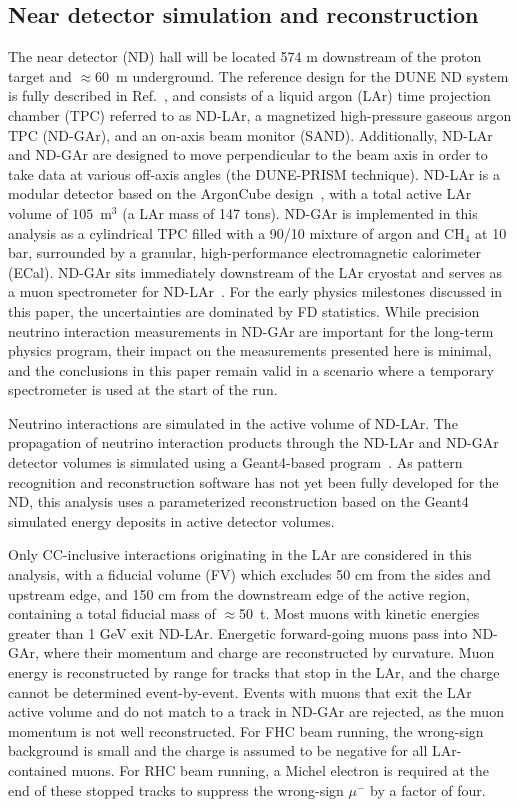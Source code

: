 \subsection{Near detector simulation and reconstruction}
The near detector (ND) hall will be located 574 m downstream of the proton target and $\approx$60~m underground. The reference design for the DUNE ND system is fully described in Ref.~\cite{AbedAbud:2021hpb}, and consists of a liquid argon (LAr) time projection chamber (TPC) referred to as ND-LAr, a magnetized high-pressure gaseous argon TPC (ND-GAr), and an on-axis beam monitor (SAND). Additionally, ND-LAr and ND-GAr are designed to move perpendicular to the beam axis in order to take data at various off-axis angles (the DUNE-PRISM technique). ND-LAr is a modular detector based on the ArgonCube design~\cite{argoncube_loi, Dwyer:2018phu, arclight}, with a total active LAr volume of $105$~m$^{3}$ (a LAr mass of 147 tons). ND-GAr is implemented in this analysis as a cylindrical TPC filled with a 90/10 mixture of argon and CH$_{4}$ at 10 bar, surrounded by a granular, high-performance electromagnetic calorimeter (ECal). ND-GAr sits immediately downstream of the LAr cryostat and serves as a muon spectrometer for ND-LAr~\cite{AbedAbud:2021hpb}. For the early physics milestones discussed in this paper, the uncertainties are dominated by FD statistics.  While precision neutrino interaction measurements in ND-GAr are important for the long-term physics program, their impact on the measurements presented here is minimal, and the conclusions in this paper remain valid in a scenario where a temporary spectrometer is used at the start of the run.

Neutrino interactions are simulated in the active volume of ND-LAr. The propagation of neutrino interaction products through the ND-LAr and ND-GAr detector volumes is simulated using a Geant4-based program~\cite{Agostinelli:2002hh}. As pattern recognition and reconstruction software has not yet been fully developed for the ND, this analysis uses a parameterized reconstruction based on the Geant4 simulated energy deposits in active detector volumes.

Only CC-inclusive interactions originating in the LAr are considered in this analysis, with a fiducial volume (FV) which excludes 50 cm from the sides and upstream edge, and 150 cm from the downstream edge of the active region, containing a total fiducial mass of $\approx$50~t. Most muons with kinetic energies greater than 1 GeV exit ND-LAr. Energetic forward-going muons pass into ND-GAr, where their momentum and charge are reconstructed by curvature. Muon energy is reconstructed by range for tracks that stop in the LAr, and the charge cannot be determined event-by-event. Events with muons that exit the LAr active volume and do not match to a track in ND-GAr are rejected, as the muon momentum is not well reconstructed. For FHC beam running, the wrong-sign background is small and the charge is assumed to be negative for all LAr-contained muons. For RHC beam running, a Michel electron is required at the end of these stopped tracks to suppress the wrong-sign $\mu^-$ by a factor of four.

